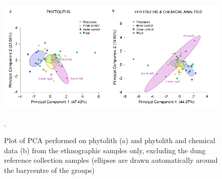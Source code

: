 \documentclass[authoryear,preprint,review,12pt]{elsarticle}
\begin{document}
\begin{figure}[ht!]
  \begin{center}
    \includegraphics[width=15cm]{figures/PCA}
    \caption{Plot of PCA performed on phytolith (a) and phytolith and chemical data (b) from the ethnographic samples only, excluding the dung reference collection samples (ellipses are drawn automatically around the barycentre of the groups)}.
    \label{fig:PCA}
  \end{center}
\end{figure}
\end{document}
